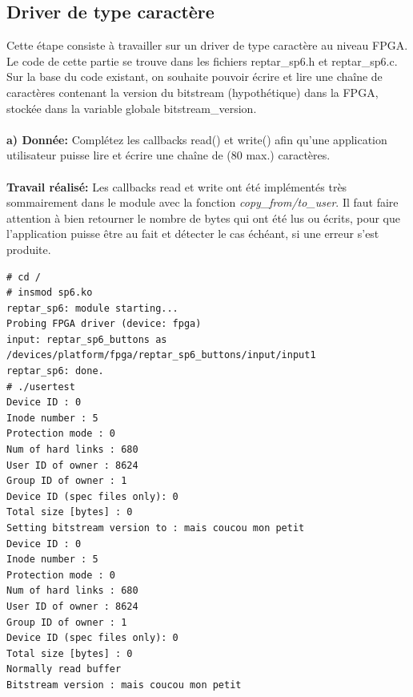 \subsection{Driver de type caractère}
Cette étape consiste à travailler sur un driver de type caractère au niveau FPGA. Le code de cette
partie se trouve dans les fichiers reptar\_sp6.h et reptar\_sp6.c.
Sur la base du code existant, on souhaite pouvoir écrire et lire une chaîne de caractères contenant la
version du bitstream (hypothétique) dans la FPGA, stockée dans la variable globale bitstream\_version.\\\\
\textbf{a) Donnée: }Complétez les callbacks read() et write() afin qu'une application utilisateur puisse lire et écrire une
chaîne de (80 max.) caractères. \\\\
\textbf{Travail réalisé: }Les callbacks read et write ont été implémentés très sommairement dans le module avec la fonction 
\textit{copy\_from/to\_user}. Il faut faire attention à bien retourner le nombre de bytes qui ont été lus ou écrits, pour que l'application puisse être au fait et détecter le cas échéant, si une erreur s'est produite.\\
\begin{lstlisting}
# cd /
# insmod sp6.ko 
reptar_sp6: module starting...
Probing FPGA driver (device: fpga)
input: reptar_sp6_buttons as /devices/platform/fpga/reptar_sp6_buttons/input/input1
reptar_sp6: done.
# ./usertest 
Device ID : 0
Inode number : 5
Protection mode : 0
Num of hard links : 680
User ID of owner : 8624
Group ID of owner : 1
Device ID (spec files only): 0
Total size [bytes] : 0
Setting bitstream version to : mais coucou mon petit                                                          
Device ID : 0
Inode number : 5
Protection mode : 0
Num of hard links : 680
User ID of owner : 8624
Group ID of owner : 1
Device ID (spec files only): 0
Total size [bytes] : 0
Normally read buffer
Bitstream version : mais coucou mon petit
\end{lstlisting}

